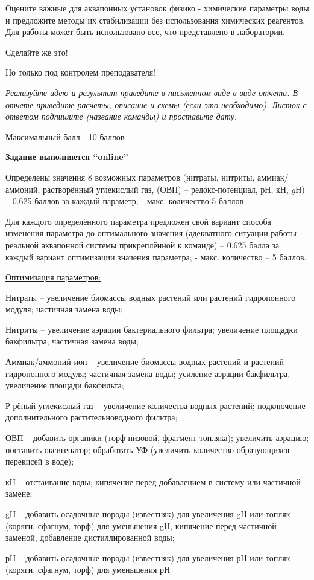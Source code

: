 
Оцените важные для аквапонных установок физико - химические параметры воды и предложите методы их стабилизации без использования химических реагентов. Для работы может быть использовано все, что представлено в лаборатории.

Сделайте же это!  

Но только под контролем преподавателя!

\textit{Реализуйте идею и результат приведите в письменном виде в виде отчета. В отчете приведите расчеты, описание и схемы (если это необходимо). Листок с ответом подпишите (название команды) и проставьте дату.}

Максимальный балл - 10 баллов

\textbf{Задание выполняется “online”}

\markSection

Определены значения 8 возможных параметров (нитраты, нитриты, аммиак/аммоний, растворённый  углекислый газ, (ОВП) – редокс-потенциал, $рН$, $кН$, $gН$) – 0.625 баллов за каждый параметр; - макс. количество 5 баллов

Для каждого определённого параметра предложен свой вариант способа изменения параметра до оптимального значения (адекватного ситуации работы реальной аквапонной системы прикреплённой к команде) – 0.625 балла за каждый вариант оптимизации значения параметра; - макс. количество – 5 баллов.

\underline{Оптимизация параметров:}

Нитраты – увеличение биомассы водных растений или растений гидропонного модуля; частичная замена воды;

Нитриты – увеличение аэрации бактериального фильтра; увеличение площадки бакфильтра; частичная замена воды;

Аммиак/аммоний-ион – увеличение биомассы водных растений и растений гидропонного модуля; частичная замена воды; усиление аэрации бакфильтра, увеличение площади бакфильта;

Р-рёный углекислый газ – увеличение количества водных растений; подключение дополнительного растительноводного фильтра;

ОВП – добавить органики (торф низовой, фрагмент топляка); увеличить аэрацию; поставить оксигенатор; обработать УФ (увеличить количество образующихся перекисей в воде);

кН – отстаивание воды; кипячение перед добавлением в систему или частичной замене;

gН – добавить осадочные породы (известняк) для увеличения gН или топляк (коряги, сфагнум, торф) для уменьшения gН, кипячение перед частичной заменой, добавление дистиллированной воды;

рН – добавить осадочные породы (известняк) для увеличения рН или топляк (коряги, сфагнум, торф) для уменьшения рН